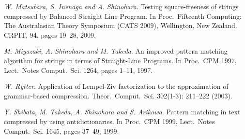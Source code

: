 \documentclass[11pt]{article}
\begin{document}
{\begin{thebibliography}{99}
\emph{W. Matsubara, S. Inenaga and A. Shinohara}. Testing
square-freeness of strings compressed by Balanced Straight Line
Program. In Proc.\ Fifteenth Computing: The Australasian Theory
Symposium (CATS 2009), Wellington, New Zealand. CRPIT, 94, pages
19--28, 2009.

\emph{M. Miyazaki, A. Shinohara and M. Takeda}. An improved
pattern matching algorithm for strings in terms of Straight-Line
Programs. In Proc.\ CPM 1997, Lect.\ Notes Comput.\ Sci. 1264,
pages 1--11, 1997.

\emph{W. Rytter}. Application of Lempel-Ziv factorization to the
approximation of grammar-based compression. Theor.\ Comput.\ Sci.
302(1-3): 211--222 (2003).

\emph{Y. Shibata, M. Takeda, A. Shinohara and S. Arikawa}. Pattern
matching in text compressed by using antidictionaries. In Proc.\
CPM 1999, Lect.\ Notes Comput.\ Sci. 1645, pages 37--49, 1999.

\end{thebibliography}

}
\end{document}
